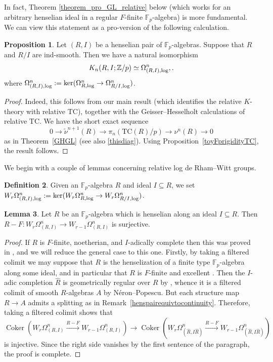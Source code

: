 \documentclass{amsart}
\theoremstyle{definition}
\newtheorem{definition}{Definition}[section]
\newtheorem{proposition}[definition]{Proposition}
\newtheorem{lemma}[definition]{Lemma}
\newcommand{\bb}{\mathbb}
\newcommand{\To}{\longrightarrow}
\newcommand{\op}{\operatorname}
\newcommand{\sub}[1]{{\mbox{\rm \scriptsize #1}}}
\renewcommand{\hat}{\widehat}
\newcommand{\xto}{\xrightarrow}
\newcommand{\TC}{\mathrm{TC}}
\begin{document}
In fact, 
Theorem \ref{theorem_pro_GL_relative} below (which works for an arbitrary
henselian ideal in a regular $F$-finite $\mathbb{F}_p$-algebra) is more
fundamental. 
We can view this statement as a pro-version of the following calculation. 

\begin{proposition} 
Let $(R, I)$ be a henselian pair of $\mathbb{F}_p$-algebras. Suppose that 
$R$ and $R/I$ are ind-smooth. 
Then we have a natural isomorphism \begin{equation} \label{relhensmodp} K_n(R,
I; \mathbb{Z}/p) \simeq \Omega^n_{(R, I), \sub{log}},.\end{equation}
where $\Omega^n_{(R, I), \sub{log}}:=\op{ker}(\Omega^n_{R,\sub{log}}\rightarrow \Omega^n_{R/I,\sub{log}})$.
\end{proposition}
\begin{proof}
Indeed, this follows from our main result (which identifies the relative
$K$-theory with relative $\TC$), 
together with the Geisser--Hesselholt calculations of relative $\TC$. 
We have
the short exact sequence
\[  0 \to \widetilde{\nu}^{n+1}(R) \to \pi_n(\TC(R)/p)  \to \nu^n(R) \to 0 
\]
as in Theorem~\ref{GHGL} (see also \eqref{thisdiag}).
Using Proposition~\ref{toyFprigidityTC}, the result follows. 
\end{proof} 




We begin with a couple of lemmas concerning relative log de Rham--Witt groups.

\begin{definition}
Given an $\bb F_p$-algebra $R$ and ideal $I\subseteq R$, we set $W_r\Omega^n_{(R,I),\sub{log}}:=\ker(W_r\Omega^n_{R,\sub{log}}\to W_r\Omega^n_{R/I,\sub{log}})$.\end{definition}

\begin{lemma}\label{lemma_drw1}
Let $R$ be an $\bb F_p$-algebra which is henselian along an ideal $I\subseteq R$. Then
$R-F:W_r\Omega^n_{(R,I)}\to W_{r-1}\Omega^n_{(R,I)}$ is surjective.
\end{lemma}
\begin{proof}

If $R$ is $F$-finite, noetherian, and $I$-adically complete then this was proved
in \cite[Prop.~2.20]{Morrow-HW}, and we will reduce the general case to this
one. Firstly, by taking a filtered colimit we may suppose that $R$ is the
henselization of a finite type $\bb F_p$-algebra along some ideal, and in
particular that $R$ is $F$-finite and excellent \cite[Tag 07QS]{stacks-project}. Then the $I$-adic completion $\hat R$ is geometrically regular over $R$ by \cite[7.8.3(v)]{EGA_IV_2}, whence it is a filtered colimit of smooth $R$-algebras $A$ by N\'eron--Popescu. But each structure map $R\to A$ admits a splitting
as in Remark~\ref{henspairequivtocontinuity}. 
Therefore, taking a filtered colimit shows that \[\op{Coker}(W_r\Omega^n_{(R,I)}\xto{R-F} W_{r-1}\Omega^n_{(R,I)})\To \op{Coker}(W_r\Omega^n_{(\hat R,I\hat R)}\xto{R-F} W_{r-1}\Omega^n_{(\hat R,I\hat R)})\] is injective. Since the right side vanishes by the first sentence of the paragraph, the proof is complete.
\end{proof}
\end{document}
